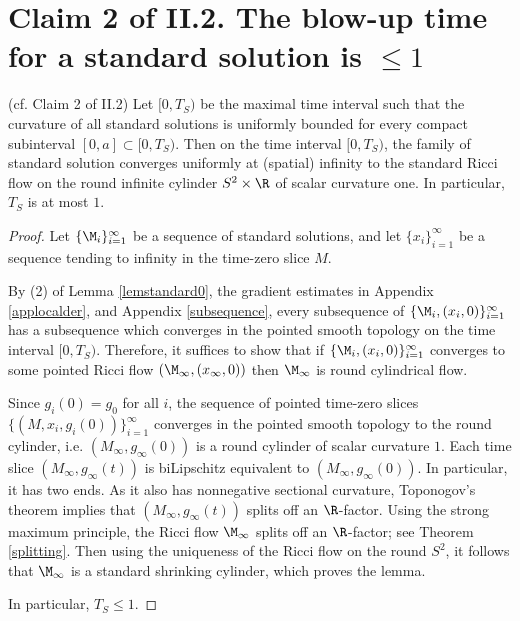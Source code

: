 \section{Claim 2 of II.2.
The blow-up time for a standard solution is $\leq 1$
} \label{claim2}

\begin{lemma}
  \label{lem:kl-blow-up-time-standard-solution-compactness-standard-solutions}
 (cf. Claim 2 of II.2) \label{lemclaim2}
Let $[0,T_S)$ be the maximal time interval such that
the curvature of all standard solutions is uniformly
bounded for every compact subinterval $[0,a]\subset [0,T_S)$.
Then on the time interval $[0,T_S)$, the family of standard solution converges
uniformly at (spatial) infinity  to the standard Ricci flow
on the round infinite cylinder $S^2\times \R$ of scalar curvature one.
In particular, $T_S$ is  at most $1$.
\end{lemma}
\begin{proof}
Let $\{\M_i\}_{i=1}^\infty$ be a sequence of standard solutions, and
let $\{x_i\}_{i=1}^\infty$ be a sequence tending to infinity
in the time-zero slice $M$.

By (2) of Lemma \ref{lemstandard0}, the gradient estimates in Appendix \ref{applocalder},
 and Appendix \ref{subsequence}, every subsequence
of $\{\M_i, (x_i,0)\}_{i=1}^\infty$ has a subsequence which
converges in the pointed smooth topology on the time interval $[0,T_S)$.
Therefore, it suffices to show that if $\{\M_i, (x_i,0)\}_{i=1}^\infty$
converges to some pointed Ricci flow
$(\M_\infty, (x_\infty, 0))$ then
$\M_\infty$ is round cylindrical flow.


Since $g_i(0)=g_0$ for all $i$,  the sequence of pointed time-zero slices
$\{(M,x_i, g_i(0))\}_{i=1}^\infty$ converges in the pointed smooth topology
to the round cylinder, i.e. $(M_\infty,g_\infty(0))$ is a round cylinder
of scalar curvature $1$. Each time slice $(M_\infty,g_\infty(t))$
is biLipschitz equivalent to $(M_\infty,g_\infty(0))$. In particular,
it has two ends. As it also has nonnegative sectional curvature,
Toponogov's theorem implies that $(M_\infty,g_\infty(t))$ splits off
an $\R$-factor. Using the strong maximum principle,
the Ricci flow $\M_\infty$ splits off an $\R$-factor;
see Theorem \ref{splitting}.
Then using the uniqueness of the Ricci flow on the round $S^2$, it
follows that $\M_\infty$ is a standard shrinking cylinder, which proves the lemma.

In particular, $T_S\leq 1$.
\end{proof}

